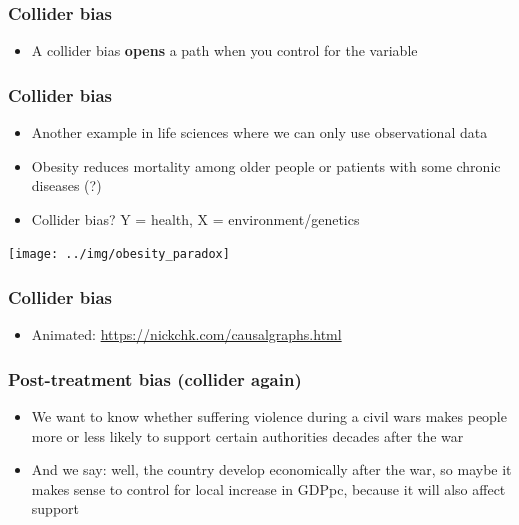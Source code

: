\documentclass[aspectratio=43]{beamer}
\begin{document}
\begin{frame}
\frametitle{Collider bias}
\centering

\begin{itemize}
  \item A collider bias \textbf{opens} a path when you control for the variable
\end{itemize}

\end{frame}

\begin{frame}
\frametitle{Collider bias}
\centering

\begin{minipage}{.54\textwidth}\centering
\begin{itemize}
  \item Another example in life sciences where we can only use observational data
  \item Obesity reduces mortality among older people or patients with some chronic diseases (?)
  \item Collider bias? Y = health, X = environment/genetics
\end{itemize}
\end{minipage}\hfill
\begin{minipage}{0.45\textwidth}\centering
\texttt{[image: ../img/obesity\_paradox]}
\end{minipage}

\end{frame}

\begin{frame}
\frametitle{Collider bias}
\centering

\begin{itemize}
  \item Animated: \url{https://nickchk.com/causalgraphs.html}
\end{itemize}

\end{frame}


\begin{frame}
\frametitle{Post-treatment bias (collider again)}\label{ptbias}
\centering

\begin{itemize}[<+->]
  \item We want to know whether suffering violence during a civil wars makes people more or less likely to support certain authorities decades after the war
  \item And we say: well, the country develop economically after the war, so maybe it makes sense to control for local increase in GDPpc, because it will also affect support
\end{itemize}

\end{frame}
\end{document}
